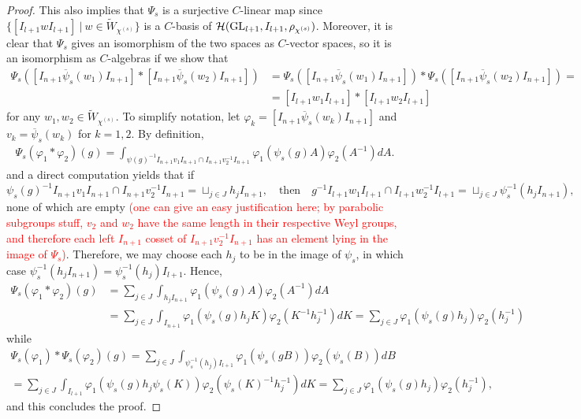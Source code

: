 \begin{proof}
        This also implies that $\Psi_s$ is a surjective $C$-linear map since $\{[I_{l+1}wI_{l+1}]\ |\ w\in\widetilde{W}_{\chi^{(s)}}\}$ is a $C$-basis of $\mathcal{H}(\mathrm{GL}_{l+1},I_{l+1},\rho_{\chi^{(s)}})$. Moreover, it is clear that $\Psi_s$ gives an isomorphism of the two spaces as $C$-vector spaces, so it is an isomorphism as $C$-algebras if we show that 
        \begin{align*}
            \Psi_s\left([I_{n+1}\overline{\psi}_s(w_1)I_{n+1}]*[I_{n+1}\overline{\psi}_s(w_2)I_{n+1}]\right)&=\Psi_s\left([I_{n+1}\overline{\psi}_s(w_1)I_{n+1}]\right)*\Psi_s\left([I_{n+1}\overline{\psi}_s(w_2)I_{n+1}]\right)=\\
            &=[I_{l+1}w_1I_{l+1}]*[I_{l+1}w_2I_{l+1}]
        \end{align*}
        for any $w_1,w_2\in\widetilde{W}_{\chi^{(s)}}$. To simplify notation, let $\varphi_k=[I_{n+1}\overline{\psi}_s(w_k)I_{n+1}]$ and $v_k=\overline{\psi}_s(w_k)$ for $k=1,2$. By definition,
        \begin{align*}
            \Psi_s\left(\varphi_1*\varphi_2\right)(g)=\int_{\psi(g)^{-1}I_{n+1}v_1I_{n+1}\cap I_{n+1}v_2^{-1}I_{n+1}}\varphi_1(\psi_s(g)A)\varphi_2(A^{-1})dA.
        \end{align*}
        and a direct computation yields that if 
        \begin{equation*}
            \psi_s(g)^{-1}I_{n+1}v_1I_{n+1}\cap I_{n+1}v_2^{-1}I_{n+1}=\sqcup_{j\in J}h_jI_{n+1},\quad\text{then}\quad g^{-1}I_{l+1}w_1I_{l+1}\cap I_{l+1}w_2^{-1}I_{l+1}=\sqcup_{j\in J}\psi_s^{-1}(h_jI_{n+1}),
        \end{equation*}
        none of which are empty \textcolor{red}{(one can give an easy justification here; by parabolic subgroups stuff, $v_2$ and $w_2$ have the same length in their respective Weyl groups, 
        and therefore each left $I_{n+1}$ cosset of $I_{n+1}v_2^{-1}I_{n+1}$ has an element lying in the image of $\Psi_s$)}. 
        Therefore, we may choose each $h_j$ to be in the image of $\psi_s$, in which case $\psi_s^{-1}(h_jI_{n+1})=\psi_s^{-1}(h_j)I_{l+1}$. Hence,
        \begin{align*}
            \Psi_s\left(\varphi_1*\varphi_2\right)(g)&=\sum_{j\in J}\int_{h_jI_{n+1}}\varphi_1(\psi_s(g)A)\varphi_2(A^{-1})dA\\
            &=\sum_{j\in J}\int_{I_{n+1}}\varphi_1(\psi_s(g)h_jK)\varphi_2(K^{-1}h_j^{-1})dK
            =\sum_{j\in J}\varphi_1(\psi_s(g)h_j)\varphi_2(h_j^{-1})
        \end{align*}
        while
        \begin{align*}
            \Psi_s\left(\varphi_1\right)*\Psi_s\left(\varphi_2\right)(g)=
            \sum_{j\in J}\int_{\psi_s^{-1}(h_j)I_{l+1}}\varphi_1(\psi_s(gB))\varphi_2(\psi_s(B))dB\\
            =\sum_{j\in J}\int_{I_{l+1}}\varphi_1(\psi_s(g)h_j\psi_s(K))\varphi_2(\psi_s(K)^{-1}h_j^{-1})dK=\sum_{j\in J}\varphi_1(\psi_s(g)h_j)\varphi_2(h_j^{-1}),
        \end{align*}
        and this concludes the proof.
    \end{proof}

